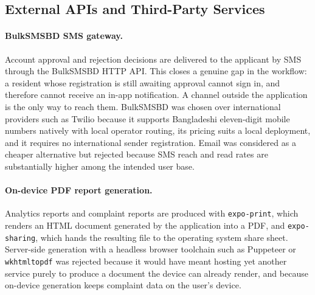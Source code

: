 \documentclass[11pt,a4paper]{article}
\newcommand{\code}[1]{\texttt{\small #1}}
\begin{document}
\subsection{External APIs and Third-Party Services}

\paragraph{BulkSMSBD SMS gateway.} Account approval and rejection decisions are
delivered to the applicant by SMS through the BulkSMSBD HTTP API. This closes a
genuine gap in the workflow: a resident whose registration is still awaiting
approval cannot sign in, and therefore cannot receive an in-app notification. A
channel outside the application is the only way to reach them. BulkSMSBD was
chosen over international providers such as Twilio because it supports
Bangladeshi eleven-digit mobile numbers natively with local operator routing, its
pricing suits a local deployment, and it requires no international sender
registration. Email was considered as a cheaper alternative but rejected because
SMS reach and read rates are substantially higher among the intended user base.

\paragraph{On-device PDF report generation.} Analytics reports and complaint
reports are produced with \code{expo-print}, which renders an HTML document
generated by the application into a PDF, and \code{expo-sharing}, which hands the
resulting file to the operating system share sheet. Server-side generation with a
headless browser toolchain such as Puppeteer or \code{wkhtmltopdf} was rejected
because it would have meant hosting yet another service purely to produce a
document the device can already render, and because on-device generation keeps
complaint data on the user's device.
\end{document}
